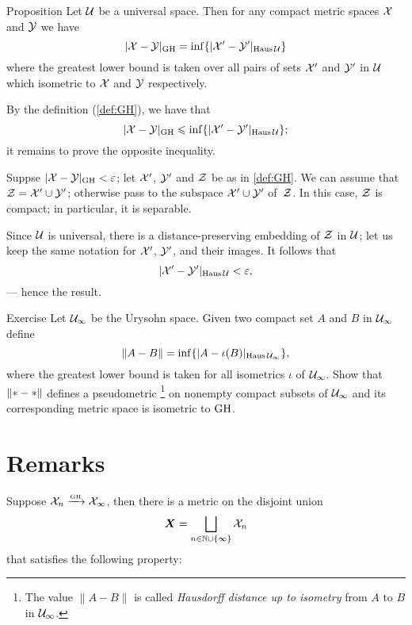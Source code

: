 \begin{thm}{Proposition}\label{prop:GH-with-fixed-Z}
Let $\mathcal{U}$ be a universal space.
Then for any compact metric spaces $\mathcal{X}$ and $\mathcal{Y}$ we have
$$|\mathcal{X}-\mathcal{Y}|_{\operatorname{\rm GH}\nolimits} = \inf \{|\mathcal{X}'-\mathcal{Y}'|_{\operatorname{\rm Haus}\nolimits\mathcal{U}}\}$$ 
where the greatest lower bound is taken over all pairs of sets $\mathcal{X}'$ and $\mathcal{Y}'$ in $\mathcal{U}$
which isometric to  $\mathcal{X}$ and $\mathcal{Y}$ respectively.  
\end{thm}




By the definition (\ref{def:GH}), we have that 
\[|\mathcal{X}-\mathcal{Y}|_{\operatorname{\rm GH}\nolimits} \leqslant \inf \{|\mathcal{X}'-\mathcal{Y}'|_{\operatorname{\rm Haus}\nolimits\mathcal{U}}\};\]
it remains to prove the opposite inequality.

Suppse $|\mathcal{X}-\mathcal{Y}|_{\operatorname{\rm GH}\nolimits}<\varepsilon$;
let $\mathcal{X}'$, $\mathcal{Y}'$ and $\mathcal{Z}$ be as in \ref{def:GH}.
We can assume that $\mathcal{Z}=\mathcal{X}'\cup\mathcal{Y}'$;
otherwise pass to the subspace $\mathcal{X}'\cup\mathcal{Y}'$ of~$\mathcal{Z}$.
In this case, $\mathcal{Z}$ is compact;
in particular, it is separable.

Since $\mathcal{U}$ is universal, there is a distance-preserving embedding of $\mathcal{Z}$ in $\mathcal{U}$;
let us keep the same notation for $\mathcal{X}'$, $\mathcal{Y}'$, and their images.
It follows that 
\[|\mathcal{X}'-\mathcal{Y}'|_{\operatorname{\rm Haus}\nolimits\mathcal{U}}<\varepsilon,\]
--- hence the result.
\qeds

\begin{thm}{Exercise}\label{ex:GH-urysohn}
Let $\mathcal{U}_\infty$ be the Urysohn space.
Given two compact set $A$ and $B$ in $\mathcal{U}_\infty$ define 
\[\|A-B\|=\inf\{|A-\iota(B)|_{\operatorname{\rm Haus}\nolimits\mathcal{U}_\infty}\},\]
where the greatest lower bound is taken for all isometrics $\iota$ of $\mathcal{U}_\infty$.
Show that $\|{*}\z-{*}\|$ defines a pseudometric%
\footnote{The value $\|A-B\|$ is called \emph{Hausdorff distance up to isometry} from $A$ to $B$ in $\mathcal{U}_\infty$.}
on nonempty compact subsets of $\mathcal{U}_\infty$ and its corresponding metric space is isometric to $\operatorname{\rm GH}\nolimits$.
\end{thm}

\section{Remarks}

Suppose $\mathcal{X}_n\xrightarrow{\mbox{\tiny\rm GH}} \mathcal{X}_\infty$, then there is a metric on the disjoint union 
\[\bm{X}=\bigsqcup_{n\in \mathbb{N}\cup\{\infty\}} \mathcal{X}_n\] 
that satisfies the following property:

